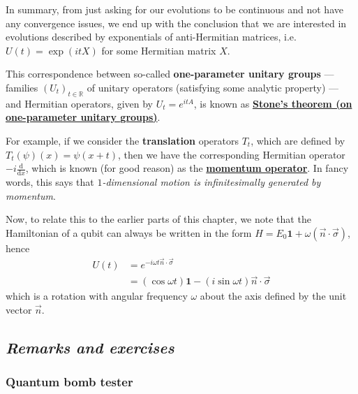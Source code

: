 \documentclass[fleqn]{article}
\newenvironment{technical}{\noindent}{\medskip}
\begin{document}
In summary, from just asking for our evolutions to be continuous and not have any convergence issues, we end up with the conclusion that we are interested in evolutions described by exponentials of anti-Hermitian matrices, i.e.~\(U(t)=\exp(itX)\) for some Hermitian matrix \(X\).

\begin{technical}
This correspondence between so-called \textbf{one-parameter unitary groups} --- families \((U_t)_{t\in\mathbb{R}}\) of unitary operators (satisfying some analytic property) --- and Hermitian operators, given by \(U_t=e^{itA}\), is known as \href{https://en.wikipedia.org/wiki/Stone\%27s_theorem_on_one-parameter_unitary_groups}{\textbf{Stone's theorem (on one-parameter unitary groups)}}.

For example, if we consider the \textbf{translation} operators \(T_t\), which are defined by \(T_t(\psi)(x)=\psi(x+t)\), then we have the corresponding Hermitian operator \(-i\frac{\mathrm{d}}{\mathrm{d}x}\), which is known (for good reason) as the \href{https://en.wikipedia.org/wiki/Momentum_operator}{\textbf{momentum operator}}.
In fancy words, this says that \emph{\(1\)-dimensional motion is infinitesimally generated by momentum}.

\end{technical}

Now, to relate this to the earlier parts of this chapter, we note that the Hamiltonian of a qubit can always be written in the form \(H = E_0\mathbf{1}+\omega(\vec{n}\cdot\vec{\sigma})\), hence
\[
  \begin{aligned}
    U(t)
    &= e^{-i\omega t \vec n\cdot\vec\sigma}
  \\&= (\cos\omega t)\mathbf{1}- (i\sin\omega t)\vec{n}\cdot\vec{\sigma}
  \end{aligned}
\]
which is a rotation with angular frequency \(\omega\) about the axis defined by the unit vector \(\vec n\).

\hypertarget{remarks-and-exercises-pauli-bloch}{%
\subsection{\texorpdfstring{\emph{Remarks and exercises}}{Remarks and exercises}}\label{remarks-and-exercises-pauli-bloch}}

\hypertarget{quantum-bomb-tester}{%
\subsubsection{Quantum bomb tester}\label{quantum-bomb-tester}}
\end{document}
